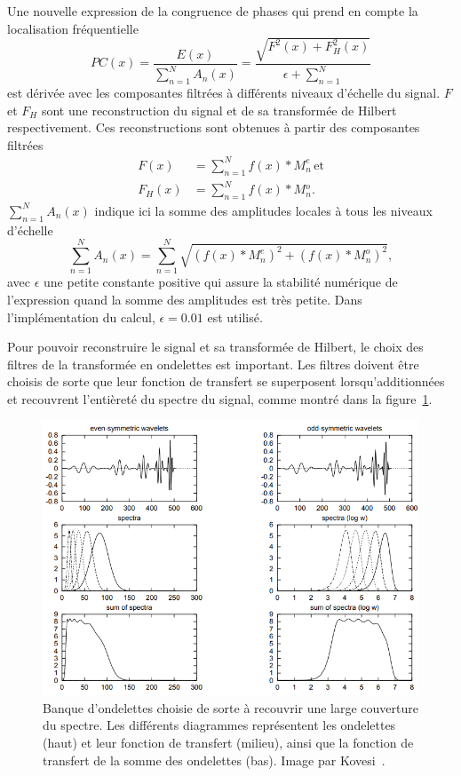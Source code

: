 Une nouvelle expression de la congruence de phases qui prend en compte la localisation fréquentielle
\begin{equation}
    PC(x) = \frac{E(x)}{\sum_{n=1}^{N} A_n(x)} = \frac{\sqrt{F^2(x)+F_H^2(x)}}{\epsilon + \sum_{n=1}^{N}}
\end{equation}
est dérivée avec les composantes filtrées à différents niveaux d'échelle du signal. $F$ et $F_H$ sont une reconstruction du signal et de sa transformée de Hilbert respectivement. Ces reconstructions sont obtenues à partir des composantes filtrées
\begin{align}
    F(x) &= \sum_{n=1}^{N} f(x)*M_n^e \,\text{et}\\
    F_H(x) &= \sum_{n=1}^{N} f(x)*M{_n^o}.
\end{align}
$\sum_{n=1}^{N} A_n(x)$ indique ici la somme des amplitudes locales à tous les niveaux d'échelle
\begin{equation}
    \sum_{n=1}^{N} A_n(x) = \sum_{n=1}^{N} \sqrt{(f(x)*M^e_n)^2 + (f(x)*M^o_n)^2},
\end{equation}
avec $\epsilon$ une petite constante positive qui assure la stabilité numérique de l'expression quand la somme des amplitudes est très petite. Dans l'implémentation du calcul, $\epsilon = 0.01$ est utilisé.

\bigskip

Pour pouvoir reconstruire le signal et sa transformée de Hilbert, le choix des filtres de la transformée en ondelettes est important. Les filtres doivent être choisis de sorte que leur fonction de transfert se superposent lorsqu'additionnées et recouvrent l'entièreté du spectre du signal, comme montré dans la figure~\ref{fig:wavelet-spectrum-coverage}.

\begin{figure}
           \centering
           \includegraphics[width=.60\textwidth]{contenu/resources/images/wavelet_spectrum_coverage}
           \caption[Choix des ondelettes pour recouvrir le spectre et permettre la reconstruction du signal]{Banque d'ondelettes choisie de sorte à recouvrir une large couverture du spectre. Les différents diagrammes représentent les ondelettes (haut) et leur fonction de transfert (milieu), ainsi que la fonction de transfert de la somme des ondelettes (bas). Image par Kovesi~\cite{kovesi_image_1995}.}
           \label{fig:wavelet-spectrum-coverage}
\end{figure}

